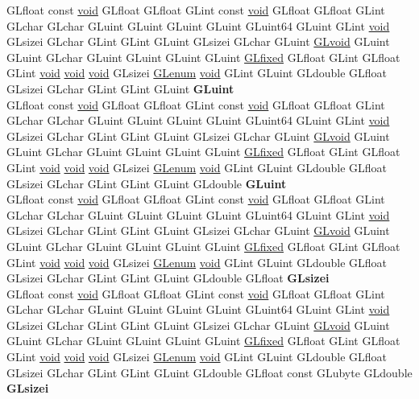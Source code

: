 \begin{DoxyCompactItemize}
\begin{tabbing}
\>GLfloat const \hyperlink{interfacevoid}{void} GLfloat GLfloat GLint const \hyperlink{interfacevoid}{void} GLfloat GLfloat GLint GLchar GLchar GLuint GLuint GLuint GLuint GLuint64 GLuint GLint \hyperlink{interfacevoid}{void} GLsizei GLchar GLint GLint GLuint GLsizei GLchar GLuint \hyperlink{interfacevoid}{GLvoid} GLuint GLuint GLchar GLuint GLuint GLuint GLuint \hyperlink{glheader_8h_ad6d3fa892df40dedf48ee6d84529ae5e}{GLfixed} GLfloat GLint GLfloat GLint \hyperlink{interfacevoid}{void} \hyperlink{interfacevoid}{void} \hyperlink{interfacevoid}{void} GLsizei \hyperlink{interfacevoid}{GLenum} \hyperlink{interfacevoid}{void} GLint GLuint GLdouble GLfloat GLsizei GLchar GLint GLint GLuint {\bfseries GLuint}\\
\>GLfloat const \hyperlink{interfacevoid}{void} GLfloat GLfloat GLint const \hyperlink{interfacevoid}{void} GLfloat GLfloat GLint GLchar GLchar GLuint GLuint GLuint GLuint GLuint64 GLuint GLint \hyperlink{interfacevoid}{void} GLsizei GLchar GLint GLint GLuint GLsizei GLchar GLuint \hyperlink{interfacevoid}{GLvoid} GLuint GLuint GLchar GLuint GLuint GLuint GLuint \hyperlink{glheader_8h_ad6d3fa892df40dedf48ee6d84529ae5e}{GLfixed} GLfloat GLint GLfloat GLint \hyperlink{interfacevoid}{void} \hyperlink{interfacevoid}{void} \hyperlink{interfacevoid}{void} GLsizei \hyperlink{interfacevoid}{GLenum} \hyperlink{interfacevoid}{void} GLint GLuint GLdouble GLfloat GLsizei GLchar GLint GLint GLuint GLdouble {\bfseries GLuint}\\
\>GLfloat const \hyperlink{interfacevoid}{void} GLfloat GLfloat GLint const \hyperlink{interfacevoid}{void} GLfloat GLfloat GLint GLchar GLchar GLuint GLuint GLuint GLuint GLuint64 GLuint GLint \hyperlink{interfacevoid}{void} GLsizei GLchar GLint GLint GLuint GLsizei GLchar GLuint \hyperlink{interfacevoid}{GLvoid} GLuint GLuint GLchar GLuint GLuint GLuint GLuint \hyperlink{glheader_8h_ad6d3fa892df40dedf48ee6d84529ae5e}{GLfixed} GLfloat GLint GLfloat GLint \hyperlink{interfacevoid}{void} \hyperlink{interfacevoid}{void} \hyperlink{interfacevoid}{void} GLsizei \hyperlink{interfacevoid}{GLenum} \hyperlink{interfacevoid}{void} GLint GLuint GLdouble GLfloat GLsizei GLchar GLint GLint GLuint GLdouble GLfloat {\bfseries GLsizei}\\
\>GLfloat const \hyperlink{interfacevoid}{void} GLfloat GLfloat GLint const \hyperlink{interfacevoid}{void} GLfloat GLfloat GLint GLchar GLchar GLuint GLuint GLuint GLuint GLuint64 GLuint GLint \hyperlink{interfacevoid}{void} GLsizei GLchar GLint GLint GLuint GLsizei GLchar GLuint \hyperlink{interfacevoid}{GLvoid} GLuint GLuint GLchar GLuint GLuint GLuint GLuint \hyperlink{glheader_8h_ad6d3fa892df40dedf48ee6d84529ae5e}{GLfixed} GLfloat GLint GLfloat GLint \hyperlink{interfacevoid}{void} \hyperlink{interfacevoid}{void} \hyperlink{interfacevoid}{void} GLsizei \hyperlink{interfacevoid}{GLenum} \hyperlink{interfacevoid}{void} GLint GLuint GLdouble GLfloat GLsizei GLchar GLint GLint GLuint GLdouble GLfloat const GLubyte GLdouble {\bfseries GLsizei}\\

\end{tabbing}
\end{DoxyCompactItemize}
